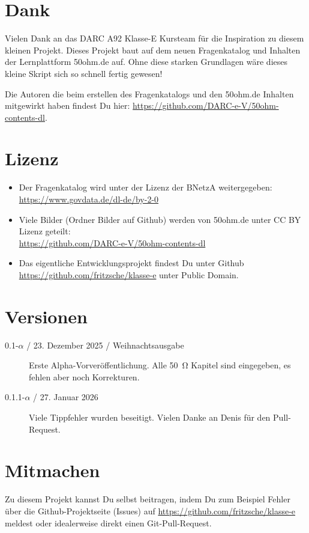 \section*{Dank}
Vielen Dank an das DARC A92 Klasse-E Kursteam für die Inspiration zu diesem kleinen Projekt.
Dieses Projekt baut auf dem neuen Fragenkatalog und Inhalten der Lernplattform 50ohm.de auf. 
Ohne diese starken Grundlagen wäre dieses kleine Skript sich so schnell fertig gewesen!

Die Autoren die beim erstellen des Fragenkatalogs und den 50ohm.de Inhalten mitgewirkt haben findest Du hier:
\href{https://github.com/DARC-e-V/50ohm-contents-dl}{https://github.com/DARC-e-V/50ohm-contents-dl}.

\section*{Lizenz}
\begin{itemize}
    \item Der Fragenkatalog wird unter der Lizenz der BNetzA weitergegeben:  \href{https://www.govdata.de/dl-de/by-2-0}{https://www.govdata.de/dl-de/by-2-0}
    \item Viele Bilder (Ordner Bilder auf Github) werden von 50ohm.de unter CC BY Lizenz geteilt:\\
    \href{https://github.com/DARC-e-V/50ohm-contents-dl}{https://github.com/DARC-e-V/50ohm-contents-dl}
    \item Das eigentliche Entwicklungsprojekt findest Du unter Github \href{https://github.com/fritzsche/klasse-e}{https://github.com/fritzsche/klasse-e} unter Public Domain.
     
\end{itemize}


\section*{Versionen}
\begin{description}
    \item[0.1-$\alpha$ / 23. Dezember 2025 / Weihnachtsausgabe]  Erste Alpha-Vorveröffentlichung. Alle \SI{50}{\ohm} Kapitel sind eingegeben, es fehlen aber noch Korrekturen.
    \item[0.1.1-$\alpha$ / 27. Januar 2026] Viele Tippfehler wurden beseitigt. Vielen Danke an Denis für den Pull-Request.
\end{description}

\section*{Mitmachen}
Zu diesem Projekt kannst Du selbst beitragen, indem Du zum Beispiel Fehler über die Github-Projektseite (Issues) auf \href{https://github.com/fritzsche/klasse-e}{https://github.com/fritzsche/klasse-e} meldest oder idealerweise direkt einen Git-Pull-Request.

